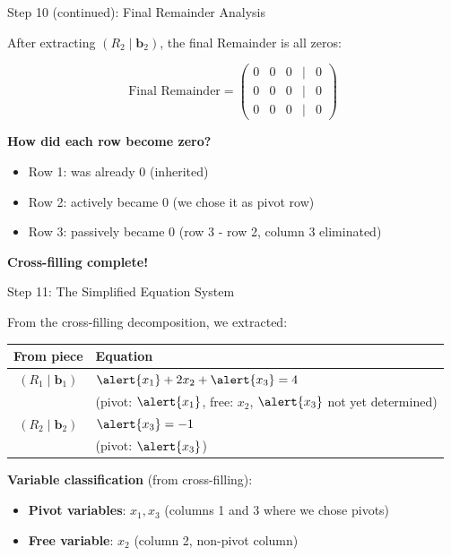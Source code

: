\documentclass[10pt]{beamer}
\theoremstyle{definition}
\newcommand{\x}[1]{\alert{\textbf{#1}}}
\begin{document}
\begin{frame}{Step 10 (continued): Final Remainder Analysis}

After extracting $(R_2 \mid \mathbf{b}_2)$, the final Remainder is all zeros:

$$\text{Final Remainder} = \begin{pmatrix}
0 & 0 & 0 & | & 0 \\
0 & 0 & 0 & | & 0 \\
0 & 0 & 0 & | & 0
\end{pmatrix}$$

\x{How did each row become zero?}
\begin{itemize}
\item Row 1: was already 0 (inherited)
\item Row 2: \alert{actively} became 0 (we chose it as pivot row)
\item Row 3: \alert{passively} became 0 (row 3 - row 2, column 3 eliminated)
\end{itemize}

\x{Cross-filling complete!}

\end{frame}

\begin{frame}{Step 11: The Simplified Equation System}

From the cross-filling decomposition, we extracted:

\vspace{1em}

\begin{center}
\begin{tabular}{c|l}
\textbf{From piece} & \textbf{Equation} \\
\hline
$(R_1 \mid \mathbf{b}_1)$ & $\alert{x_1} + 2x_2 + \alert{x_3} = 4$ \\
& (pivot: $\alert{x_1}$, free: $x_2$, $\alert{x_3}$ not yet determined) \\
\hline
$(R_2 \mid \mathbf{b}_2)$ & $\alert{x_3} = -1$ \\
& (pivot: $\alert{x_3}$) \\
\end{tabular}
\end{center}

\vspace{1em}

\x{Variable classification} (from cross-filling):
\begin{itemize}
\item \x{Pivot variables}: $x_1, x_3$ (columns 1 and 3 where we chose pivots)
\item \x{Free variable}: $x_2$ (column 2, non-pivot column)
\end{itemize}

\end{frame}
\end{document}
